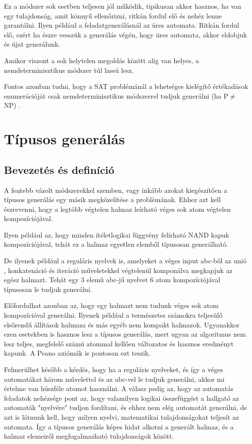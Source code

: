 \documentclass[12pt]{report}
\theoremstyle{definition}
\begin{document}
Ez a módszer sok esetben teljesen jól működik, tipikusan akkor hasznos, ha van egy tulajdonság, amit könnyű ellenőrizni, ritkán fordul elő és nehéz lenne garantálni. Ilyen például a feladatgenerálásnál az üres automata. Ritkán fordul elő, ezért ha észre vesszük a generálás végén, hogy üres automata, akkor eldobjuk és újat generálunk.

Amikor viszont a sok helytelen megoldás között alig van helyes, a nemdeterminisztikus módszer túl lassú lesz.

Fontos azonban tudni, hogy a SAT problémánál a lehetséges kielégítő értékadások enumerációját csak nemdeterminisztikus módszerrel tudjuk generálni (ha P$\neq$NP) .

\chapter{Típusos generálás}
\section{Bevezetés és definíció}
A fentebb vázolt módszerekkel szemben, vagy inkább azokat kiegészítően a típusos generálás egy másik megközelítése a problémának. Ehhez azt kell észrevenni, hogy a legtöbb végtelen halmaz leírható véges sok atom végtelen kompozíciójával.

Ilyen például az, hogy minden ítéletlogikai függvény felírható NAND kapuk kompozíciójával, tehát ez a halmaz egyetlen elemből típusosan generálható.

De ilyenek például a reguláris nyelvek is, amelyeket a véges input abc-ből az unió , konkatenáció és iteráció műveletekkel végtelenül komponálva megkapjuk az egész halmazt. Tehát egy 3 elemű abc-jű nyelvet 6 atom kompozíciójával típusosan le tudjuk generálni.

Előfordulhat azonban az, hogy egy halmazt nem tudunk véges sok atom kompozícióval generálni. Ilyenek például a természetes számokra teljesülő elsőrendű állítások halmaza és más egyéb nem kompakt halmazok. Ugyanakkor ezen esetekben is hasznos lesz a típusos generálás, mert ugyan az algoritmus nem lesz teljes, megfelelő számú atommal kellően változatos és hasznos eredményt kapunk. A Peano axiómák is pontosan ezt teszik.

Felmerülhet később a kérdés, hogy ha a reguláris nyelveket, és így a véges automatákat három művelettel és az abc-vel le tudjuk generálni, akkor mi értelme van húszféle atomot használni. A válasz pedig az, hogy az automatás feladatok nehézsége pont az, hogy valamilyen logikai összefüggést a hallgató az automaták "nyelvére" tudjon fordítani, és ehhez nem elég automatát generálni, de azt is látnunk kell, hogy milyen nyelvi, matematikai tulajdonságokat teljesít az automata. Így a típusos generálás képes hidat alkotni a generált halmaz, és a halmaz elemeiről megfogalmazható tulajdonságok között.\\
\end{document}
